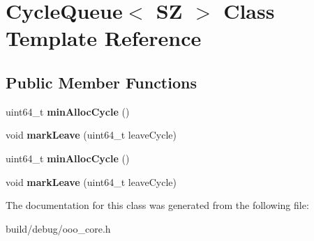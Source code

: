 \hypertarget{classCycleQueue}{\section{Cycle\-Queue$<$ S\-Z $>$ Class Template Reference}
\label{classCycleQueue}
}
\subsection*{Public Member Functions}
\begin{DoxyCompactItemize}
\item 
\hypertarget{classCycleQueue_ac55b685ddcebad295752ed52dd1fd0bb}{uint64\-\_\-t {\bfseries min\-Alloc\-Cycle} ()}\label{classCycleQueue_ac55b685ddcebad295752ed52dd1fd0bb}

\item 
\hypertarget{classCycleQueue_a271cdaefc77e3b46761c35bc4cacbf7e}{void {\bfseries mark\-Leave} (uint64\-\_\-t leave\-Cycle)}\label{classCycleQueue_a271cdaefc77e3b46761c35bc4cacbf7e}

\item 
\hypertarget{classCycleQueue_ac55b685ddcebad295752ed52dd1fd0bb}{uint64\-\_\-t {\bfseries min\-Alloc\-Cycle} ()}\label{classCycleQueue_ac55b685ddcebad295752ed52dd1fd0bb}

\item 
\hypertarget{classCycleQueue_a271cdaefc77e3b46761c35bc4cacbf7e}{void {\bfseries mark\-Leave} (uint64\-\_\-t leave\-Cycle)}\label{classCycleQueue_a271cdaefc77e3b46761c35bc4cacbf7e}

\end{DoxyCompactItemize}


The documentation for this class was generated from the following file\-:\begin{DoxyCompactItemize}
\item 
build/debug/ooo\-\_\-core.\-h\end{DoxyCompactItemize}
